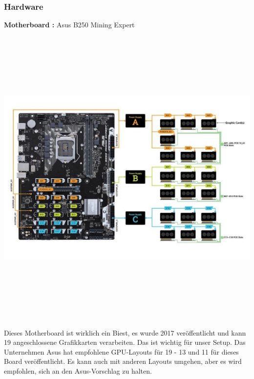 \documentclass[ngerman]{scrreprt}
\begin{document}
\subsubsection{Hardware}
\begin{large}
	\textbf{Motherboard :} Asus B250 Mining Expert \\ \\
	\includegraphics[width=15cm,height=15cm]{motherboard}  \\ \\
	Dieses Motherboard ist wirklich ein Biest, es wurde 2017 veröffentlicht und kann 19 angeschlossene Grafikkarten verarbeiten. Das ist wichtig für unser Setup.
	Das Unternehmen Asus hat empfohlene GPU-Layouts für 19 - 13 und 11 für dieses Board veröffentlicht. Es kann auch mit anderen Layouts umgehen, aber es wird empfohlen, sich an den Asus-Vorschlag zu halten.
	
\end{large}
\newpage
\end{document}
